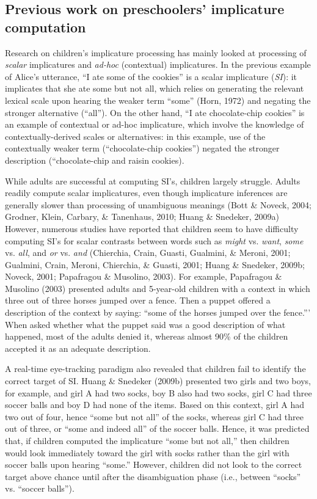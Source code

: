 \documentclass[a4paper,man,apacite,floatsintext]{apa6}
\begin{document}
\subsection{Previous work on preschoolers' implicature
computation}\label{previous-work-on-preschoolers-implicature-computation}

Research on children's implicature processing has mainly looked at
processing of \emph{scalar} implicatures and \emph{ad-hoc} (contextual)
implicatures. In the previous example of Alice's utterance, ``I ate some
of the cookies'' is a scalar implicature (\emph{SI}): it implicates that
she ate some but not all, which relies on generating the relevant
lexical scale upon hearing the weaker term ``some'' (Horn, 1972) and
negating the stronger alternative (``all''). On the other hand, ``I ate
chocolate-chip cookies'' is an example of contextual or ad-hoc
implicature, which involve the knowledge of contextually-derived scales
or alternatives: in this example, use of the contextually weaker term
(``chocolate-chip cookies'') negated the stronger description
(``chocolate-chip and raisin cookies).

While adults are successful at computing SI's, children largely
struggle. Adults readily compute scalar implicatures, even though
implicature inferences are generally slower than processing of
unambiguous meanings (Bott \& Noveck, 2004; Grodner, Klein, Carbary, \&
Tanenhaus, 2010; Huang \& Snedeker, 2009a) However, numerous studies
have reported that children seem to have difficulty computing SI's for
scalar contrasts between words such as \emph{might} vs. \emph{want},
\emph{some} vs. \emph{all}, and \emph{or} vs. \emph{and} (Chierchia,
Crain, Guasti, Gualmini, \& Meroni, 2001; Gualmini, Crain, Meroni,
Chierchia, \& Guasti, 2001; Huang \& Snedeker, 2009b; Noveck, 2001;
Papafragou \& Musolino, 2003). For example, Papafragou \& Musolino
(2003) presented adults and 5-year-old children with a context in which
three out of three horses jumped over a fence. Then a puppet offered a
description of the context by saying: ``some of the horses jumped over
the fence.''' When asked whether what the puppet said was a good
description of what happened, most of the adults denied it, whereas
almost 90\% of the children accepted it as an adequate description.

A real-time eye-tracking paradigm also revealed that children fail to
identify the correct target of SI. Huang \& Snedeker (2009b) presented
two girls and two boys, for example, and girl A had two socks, boy B
also had two socks, girl C had three soccer balls and boy D had none of
the items. Based on this context, girl A had two out of four, hence
``some but not all'' of the socks, whereas girl C had three out of
three, or ``some and indeed all'' of the soccer balls. Hence, it was
predicted that, if children computed the implicature ``some but not
all,'' then children would look immediately toward the girl with socks
rather than the girl with soccer balls upon hearing ``some.'' However,
children did not look to the correct target above chance until after the
disambiguation phase (i.e., between ``socks'' vs. ``soccer balls'').
\end{document}
